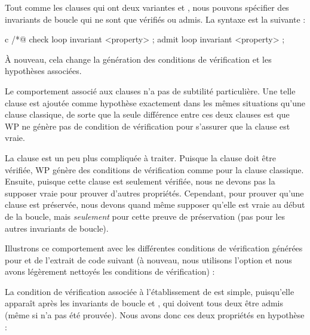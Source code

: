 

\label{l3:statements-loops-inv-kinds}


Tout comme les clauses  qui ont deux variantes
 et , nous pouvons spécifier des invariants
de boucle qui ne sont que vérifiés ou admis. La syntaxe est la suivante :


\begin{CodeBlock}{c}
/*@ check loop invariant <property> ;
    admit loop invariant <property> ;
\end{CodeBlock}


À nouveau, cela change la génération des conditions de vérification et les
hypothèses associées.


Le comportement associé aux clauses  n'a pas
de subtilité particulière. Une telle clause est ajoutée comme hypothèse exactement
dans les mêmes situations qu'une clause 
classique, de sorte que la seule différence entre ces deux clauses est
que WP ne génère pas de condition de vérification pour s'assurer
que la clause  est vraie.


La clause  est un peu plus compliquée à
traiter. Puisque la clause doit être vérifiée, WP génère des conditions de
vérification comme pour la clause 
classique. Ensuite, puisque cette clause est seulement vérifiée, nous ne devons
pas la supposer vraie pour prouver d'autres propriétés. Cependant, pour prouver
qu'une clause  est préservée, nous devons
quand même supposer qu'elle est vraie au début de la boucle, mais
\textit{seulement} pour cette preuve de préservation (pas pour les autres
invariants de boucle).


Illustrons ce comportement avec les différentes conditions de vérification
générées pour  et  de l'extrait de code suivant
(à nouveau, nous utilisons l'option  et nous avons
légèrement nettoyés les conditions de vérification) :




La condition de vérification associée à l'établissement de  est
simple, puisqu'elle apparaît après les invariants de boucle  et
, qui doivent tous deux être admis (même si  n'a
pas été prouvée). Nous avons donc ces deux propriétés en hypothèse :


